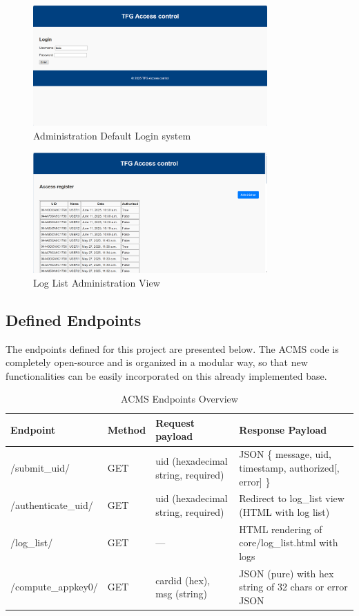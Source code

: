 \begin{figure}[h]
	\centering
	\includegraphics[width=0.8\textwidth]{imaxes/login} 
	\caption{Administration Default Login system}
	\label{fig:login_view}
\end{figure}

\begin{figure}[H]
	\centering
	\includegraphics[width=0.8\textwidth]{imaxes/loglist} %
	\caption{Log List Administration View}
	\label{fig:log_list_view}
\end{figure}

\clearpage

\subsection{Defined Endpoints}
The endpoints defined for this project are presented below. The ACMS code is completely open-source and is organized in a modular way, so that new functionalities can be easily incorporated on this already implemented base.

\begin{table}[H]

	\begin{tabular}{|l|l|p{2.5cm}|p{2.5cm}|}
		\hline
		\textbf{Endpoint} & \textbf{Method} & \textbf{Request payload} & \textbf{Response Payload} \\ \hline
		/submit\_uid/ & GET & uid (hexadecimal string, required) & JSON \{ message, uid, timestamp, authorized[, error] \} \\ \hline
		/authenticate\_uid/ & GET & uid (hexadecimal string, required) & Redirect to log\_list view (HTML with log list) \\ \hline
		/log\_list/ & GET & --- & HTML rendering of core/log\_list.html with logs \\ \hline
		/compute\_appkey0/ & GET & cardid (hex), msg (string) & JSON (pure) with hex string of 32 chars or error JSON \\ \hline
	\end{tabular}
	\caption{ACMS Endpoints Overview}
	\label{tab:endpoints}
\end{table}


